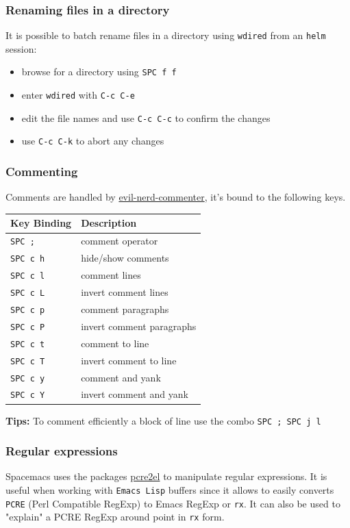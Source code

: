 \documentclass[11pt]{article}
\begin{document}
\subsubsection{Renaming files in a directory}
\label{sec:org64981af}
It is possible to batch rename files in a directory using \texttt{wdired} from an
\texttt{helm} session:
\begin{itemize}
\item browse for a directory using \texttt{SPC f f}
\item enter \texttt{wdired} with \texttt{C-c C-e}
\item edit the file names and use \texttt{C-c C-c} to confirm the changes
\item use \texttt{C-c C-k} to abort any changes
\end{itemize}

\subsubsection{Commenting}
\label{sec:orgff81612}
Comments are handled by \href{https://github.com/redguardtoo/evil-nerd-commenter}{evil-nerd-commenter}, it's bound to the following keys.

\begin{center}
\begin{tabular}{ll}
Key Binding & Description\\
\hline
\texttt{SPC ;} & comment operator\\
\texttt{SPC c h} & hide/show comments\\
\texttt{SPC c l} & comment lines\\
\texttt{SPC c L} & invert comment lines\\
\texttt{SPC c p} & comment paragraphs\\
\texttt{SPC c P} & invert comment paragraphs\\
\texttt{SPC c t} & comment to line\\
\texttt{SPC c T} & invert comment to line\\
\texttt{SPC c y} & comment and yank\\
\texttt{SPC c Y} & invert comment and yank\\
\end{tabular}
\end{center}

\textbf{Tips:} To comment efficiently a block of line use the combo \texttt{SPC ; SPC j l}

\subsubsection{Regular expressions}
\label{sec:orgc4610c8}
Spacemacs uses the packages \href{https://github.com/joddie/pcre2el}{pcre2el} to manipulate regular expressions. It is
useful when working with \texttt{Emacs Lisp} buffers since it allows to easily converts
\texttt{PCRE} (Perl Compatible RegExp) to Emacs RegExp or \texttt{rx}. It can also be used to
"explain" a PCRE RegExp around point in \texttt{rx} form.
\end{document}
